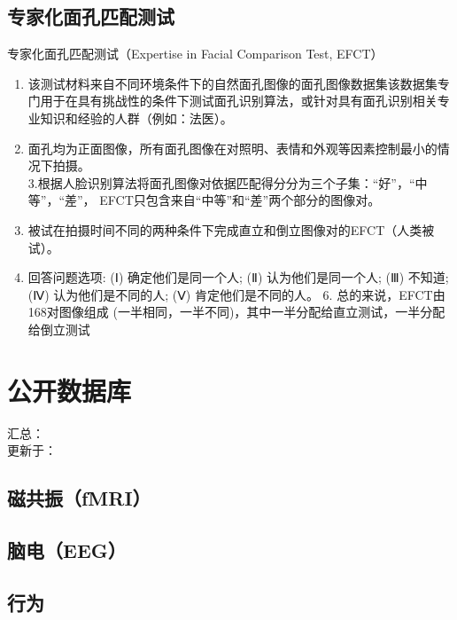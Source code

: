 \documentclass[]{ctexbook}
\providecommand{\tightlist}{%
  \setlength{\itemsep}{0pt}\setlength{\parskip}{0pt}}
\theoremstyle{definition}
\theoremstyle{definition}
\theoremstyle{definition}
\theoremstyle{definition}
\theoremstyle{remark}
\begin{document}
\section{专家化面孔匹配测试}\label{ux4e13ux5bb6ux5316ux9762ux5b54ux5339ux914dux6d4bux8bd5}

专家化面孔匹配测试（Expertise in Facial Comparison Test, EFCT）

\begin{enumerate}
\def\labelenumi{\arabic{enumi}.}
\tightlist
\item
  该测试材料来自不同环境条件下的自然面孔图像的面孔图像数据集该数据集专门用于在具有挑战性的条件下测试面孔识别算法，或针对具有面孔识别相关专业知识和经验的人群（例如：法医）。\\
\item
  面孔均为正面图像，所有面孔图像在对照明、表情和外观等因素控制最小的情况下拍摄。\\
  3.根据人脸识别算法将面孔图像对依据匹配得分分为三个子集：``好''，``中等''，``差''， EFCT只包含来自``中等''和``差''两个部分的图像对。\\
\item
  被试在拍摄时间不同的两种条件下完成直立和倒立图像对的EFCT（人类被试）。\\
\item
  回答问题选项: (Ⅰ) 确定他们是同一个人; (Ⅱ) 认为他们是同一个人; (Ⅲ) 不知道; (Ⅳ) 认为他们是不同的人; (Ⅴ) 肯定他们是不同的人。 6. 总的来说，EFCT由168对图像组成 (一半相同，一半不同)，其中一半分配给直立测试，一半分配给倒立测试
\end{enumerate}

\chapter{公开数据库}\label{opendata}

汇总：\\
更新于：

\section{磁共振（fMRI）}\label{ux78c1ux5171ux632ffmri}

\section{脑电（EEG）}\label{ux8111ux7535eeg}

\section{行为}\label{ux884cux4e3a}
\end{document}
